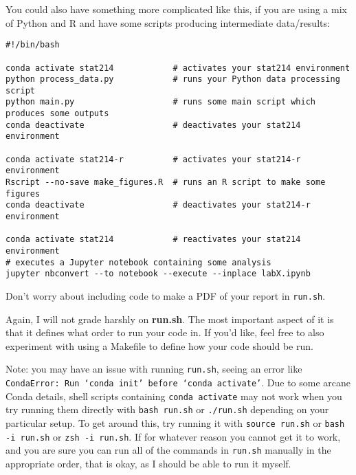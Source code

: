 \documentclass[letterpaper,12pt]{article}
\begin{document}
You could also have something more complicated like this, if you are using a mix of Python and R and have some scripts producing intermediate data/results:
\begin{verbatim}
#!/bin/bash

conda activate stat214            # activates your stat214 environment
python process_data.py            # runs your Python data processing script
python main.py                    # runs some main script which produces some outputs
conda deactivate                  # deactivates your stat214 environment

conda activate stat214-r          # activates your stat214-r environment
Rscript --no-save make_figures.R  # runs an R script to make some figures
conda deactivate                  # deactivates your stat214-r environment

conda activate stat214            # reactivates your stat214 environment
# executes a Jupyter notebook containing some analysis
jupyter nbconvert --to notebook --execute --inplace labX.ipynb
\end{verbatim}
Don't worry about including code to make a PDF of your report in \texttt{run.sh}.

Again, I will not grade harshly on \textbf{run.sh}. The most important aspect of it is that it defines what order to run your code in. If you'd like, feel free to also experiment with using a Makefile to define how your code should be run.

Note: you may have an issue with running \texttt{run.sh}, seeing an error like \texttt{CondaError:  Run `conda init' before `conda activate'}. Due to some arcane Conda details, shell scripts containing \texttt{conda activate} may not work when you try running them directly with \texttt{bash run.sh} or \texttt{./run.sh} depending on your particular setup. To get around this, try running it with \texttt{source run.sh} or \texttt{bash -i run.sh}  or \texttt{zsh -i run.sh}. If for whatever reason you cannot get it to work, and you are sure you can run all of the commands in \texttt{run.sh} manually in the appropriate order, that is okay, as I should be able to run it myself.
\end{document}

